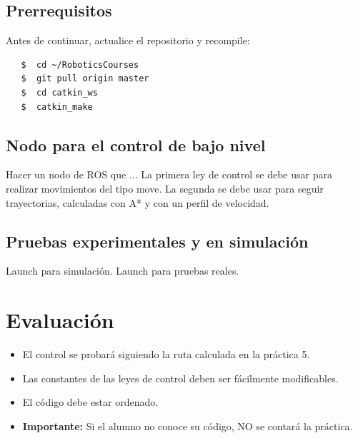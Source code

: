\documentclass[letterpaper,12pt]{article}
\begin{document}
\subsection{Prerrequisitos}
Antes de continuar, actualice el repositorio y recompile:
\begin{verbatim}
   $  cd ~/RoboticsCourses
   $  git pull origin master
   $  cd catkin_ws
   $  catkin_make
\end{verbatim}

\subsection{Nodo para el control de bajo nivel}
Hacer un nodo de ROS que ...
La primera ley de control se debe usar para realizar movimientos del tipo move.
La segunda se debe usar para seguir trayectorias, calculadas con A* y con un perfil de velocidad. 

\subsection{Pruebas experimentales y en simulación}
Launch para simulación. Launch para pruebas reales.

\section{Evaluación}
\begin{itemize}
\item El control se probará siguiendo la ruta calculada en la práctica 5. 
\item Las constantes de las leyes de control deben ser fácilmente modificables. 
\item El código debe estar ordenado.
\item \textbf{Importante: } Si el alumno no conoce su código, NO se contará la práctica.
\end{itemize}
\end{document}
